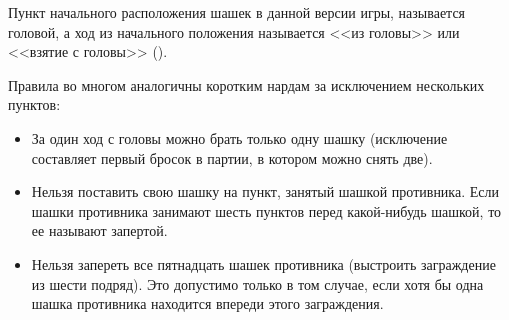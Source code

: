 Пункт начального расположения шашек в данной версии игры, называется головой, а ход из начального положения называется <<из головы>> или <<взятие с головы>> ().

Правила во многом аналогичны коротким нардам за исключением нескольких пунктов:
\begin{itemize}
    \item За один ход с головы можно брать только одну шашку (исключение составляет первый бросок в партии, в котором можно снять две).
    \item Нельзя поставить свою шашку на пункт, занятый шашкой противника. Если шашки противника занимают шесть пунктов перед какой-нибудь шашкой, то ее называют запертой.
    \item Нельзя запереть все пятнадцать шашек противника (выстроить заграждение из шести подряд). Это допустимо только в том случае, если хотя бы одна шашка противника находится впереди этого заграждения.
\end{itemize}

